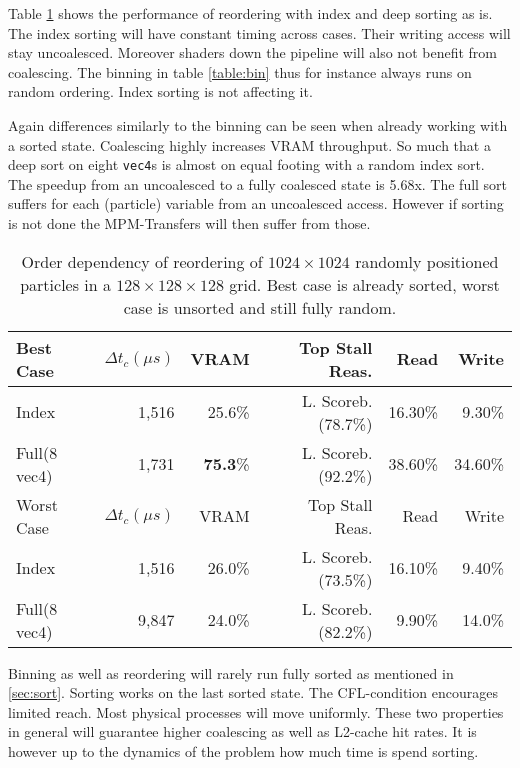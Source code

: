 \documentclass[m,times]{cgMA}
\begin{document}
Table \ref{table:sort} shows the performance of reordering with index and deep sorting as is. The index sorting will have constant timing across cases. Their writing access will stay uncoalesced. Moreover shaders down the pipeline will also not benefit from coalescing. The binning in table \ref{table:bin} thus for instance always runs on random ordering. Index sorting is not affecting it.

Again differences similarly to the binning can be seen when already working with a sorted state. Coalescing highly increases VRAM throughput. So much that a deep sort on eight \texttt{vec4}s is almost on equal footing with a random index sort. The speedup from an uncoalesced to a fully coalesced state is 5.68x. The full sort suffers for each (particle) variable from an uncoalesced access. However if sorting is not done the MPM-Transfers will then suffer from those.

\begin{table}[htpb]
  \begin{tabular}{ | l | r | r | r | r | r| }    \hline
    Best Case    &  $\Delta t_c (\mu s)$&VRAM  & Top Stall Reas.    & Read   & Write  \\\hline
    Index        &  1,516       &25.6\%& L. Scoreb.(78.7\%) & 16.30\%& 9.30\% \\\hline
    Full(8 vec4) &  1,731       &\textbf{75.3}\%& L. Scoreb.(92.2\%) & 38.60\%& 34.60\%\\
    \hline
    \hline
    Worst Case             &  $\Delta t_c(\mu s)$         &VRAM              & Top Stall Reas.    & Read   & Write\\\hline
    Index                  &  1,516                &26.0\%            & L. Scoreb.(73.5\%) & 16.10\%& 9.40\%\\\hline
    Full(8 vec4)           &  9,847                &24.0\%            & L. Scoreb.(82.2\%) & 9.90\% & 14.0\%\\
    \hline
 \end{tabular}
\caption{Order dependency of reordering of $1024\times1024$ randomly positioned particles in a $128\times128\times128$ grid. Best case is already sorted, worst case is unsorted and still fully random.}\label{table:sort}
\end{table}

Binning as well as reordering will rarely run fully sorted as mentioned in \ref{sec:sort}. Sorting works on the last sorted state. The CFL-condition encourages limited reach. Most physical processes will move uniformly. These two properties in general will guarantee higher coalescing as well as L2-cache hit rates. It is however up to the dynamics of the problem how much time is spend sorting.
\\
\end{document}
